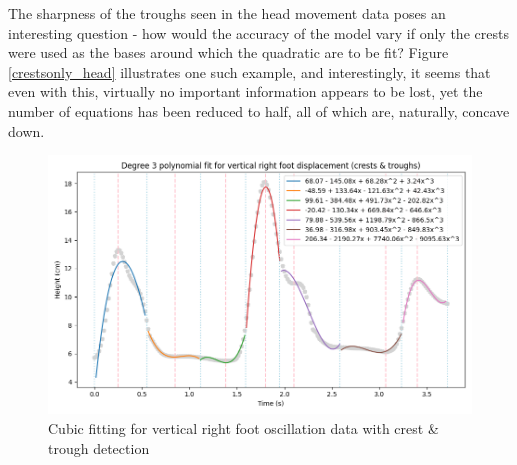 \documentclass[12pt, a4paper]{article}
\begin{document}
The sharpness of the troughs seen in the head movement data poses an interesting
question - how would the accuracy of the model vary if only the crests were used
as the bases around which the quadratic are to be fit? Figure
\ref{crestsonly_head} illustrates one such example, and interestingly, it seems
that even with this, virtually no important information appears to be lost, yet
the number of equations has been reduced to half, all of which are, naturally,
concave down.

\begin{figure}[H]
    \centering
    \includegraphics[width=\textwidth]{p_peaks_right_3.png}
    \caption{Cubic fitting for vertical right foot oscillation data with crest \& trough detection} 
    \label{peaks_right}
\end{figure}

\end{document}
